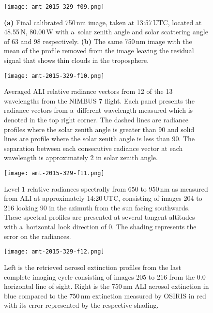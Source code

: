 \documentclass[amt]{copernicus}
\begin{document}
\begin{figure}[t]
\texttt{[image: amt-2015-329-f09.png]}
\caption{\textbf{(a)} Final calibrated 750\,\unit{nm} image, taken at
  13:57\,UTC, located at 48.55{\degree}\,N, 80.00{\degree}\,W with
  a~solar zenith angle and solar scattering angle of 63 and
  98{\degree} respectively. \textbf{(b)} The same 750\,\unit{nm} image
  with the mean of the profile removed from the image leaving the
  residual signal that shows thin clouds in the troposphere.}
\end{figure}

\begin{figure*}[t]
\texttt{[image: amt-2015-329-f10.png]}
\caption{Averaged ALI relative radiance vectors from 12 of the 13
  wavelengths from the NIMBUS 7 flight. Each panel presents the
  radiance vectors from a~different wavelength measured which is
  denoted in the top right corner. The dashed lines are radiance
  profiles where the solar zenith angle is greater than 90{\degree}
  and solid lines are profile where the solar zenith angle is less
  than 90{\degree}. The separation between each consecutive radiance vector at each wavelength is approximately 2{\degree} in solar zenith angle. }
\end{figure*}



\begin{figure}[t]
\texttt{[image: amt-2015-329-f11.png]}
\caption{Level 1 relative radiances spectrally from 650 to
  950\,\unit{nm} as measured from ALI at approximately 14:20\,UTC,
  consisting of images 204 to 216 looking 90{\degree} in the
  azimuth from the sun facing southwards. These spectral profiles are
  presented at several tangent altitudes with a~horizontal look
  direction of 0{\degree}. The shading represents the error on the
  radiances.}
\end{figure}


\begin{figure*}[t]
\texttt{[image: amt-2015-329-f12.png]}
\caption{Left is the retrieved aerosol extinction profiles from the
  last complete imaging cycle consisting of images 205 to 216 from the
  0.0{\degree} horizontal line of sight. Right is the 750\,\unit{nm}
  ALI aerosol extinction in blue compared to the 750\,\unit{nm} extinction measured by OSIRIS
  in red with its error represented by the respective
  shading.}
\end{figure*}
\end{document}
